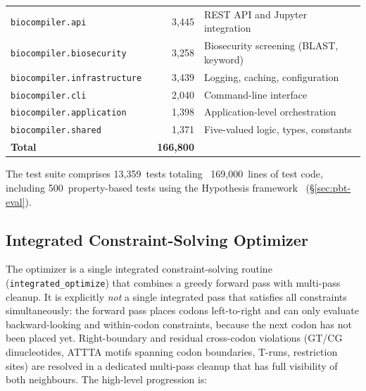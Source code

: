 \documentclass[acmsmall,review,anonymous]{acmart}
\begin{document}
\begin{table}[t]
\begin{tabular}{lrp{4.2cm}}
\texttt{biocompiler.api}              &  3,445 & REST API and Jupyter integration \\
\texttt{biocompiler.biosecurity}      &  3,258 & Biosecurity screening (BLAST, keyword) \\
\texttt{biocompiler.infrastructure}  &  3,439 & Logging, caching, configuration \\
\texttt{biocompiler.cli}              &  2,040 & Command-line interface \\
\texttt{biocompiler.application}      &  1,398 & Application-level orchestration \\
\texttt{biocompiler.shared}           &  1,371 & Five-valued logic, types, constants \\
\midrule
\textbf{Total}                        & \textbf{~166,800} & \\
\bottomrule
\end{tabular}
\end{table}

The test suite comprises 13,359~tests totaling ~169,000~lines of test code,
including 500~property-based tests using the Hypothesis
framework~\cite{maciver2019hypothesis} (\S\ref{sec:pbt-eval}).

\subsection{Integrated Constraint-Solving Optimizer}\label{sec:optimizer}

The optimizer is a single integrated constraint-solving routine
(\texttt{integrated\_optimize}) that combines a greedy forward pass
with multi-pass cleanup.  It is explicitly \emph{not} a single
integrated pass that satisfies all constraints simultaneously: the
forward pass places codons left-to-right and can only evaluate
backward-looking and within-codon constraints, because the next codon
has not been placed yet.  Right-boundary and residual cross-codon
violations (GT/CG dinucleotides, ATTTA motifs spanning codon
boundaries, T-runs, restriction sites) are resolved in a dedicated
multi-pass cleanup that has full visibility of both neighbours.  The
high-level progression is:
\end{document}
